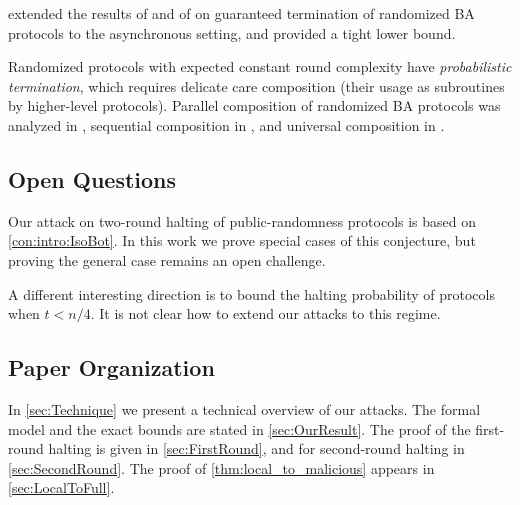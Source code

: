 
\citet{AH10} extended the results of \citet{CMS89} and of \citet{KY86} on guaranteed termination of randomized BA protocols to the asynchronous setting, and provided a tight lower bound.

Randomized protocols with expected constant round complexity have \emph{probabilistic termination}, which requires delicate care \wrt composition (\ie their usage as subroutines by higher-level protocols). Parallel composition of randomized BA protocols was analyzed in \cite{Ben-Or83,FG03}, sequential composition in \cite{LLR06}, and universal composition in \cite{CCGZ16,CCGZ17}.

\subsection{Open Questions}\label{sec:OpenQuest}
Our attack on two-round halting of public-randomness protocols is based on \cref{con:intro:IsoBot}. In this work we prove special cases of this conjecture, but proving the general case remains an open challenge.

A different interesting direction is to bound the halting probability of protocols when $t<n/4$. It is not clear how to extend our attacks to this regime.

\subsection*{Paper Organization}

In \cref{sec:Technique} we present a technical overview of our attacks. The formal model and the exact bounds are stated in \cref{sec:OurResult}. The proof of the first-round halting is given in \cref{sec:FirstRound}, and for second-round halting in \cref{sec:SecondRound}.
The proof of \cref{thm:local_to_malicious} appears in \cref{sec:LocalToFull}.
